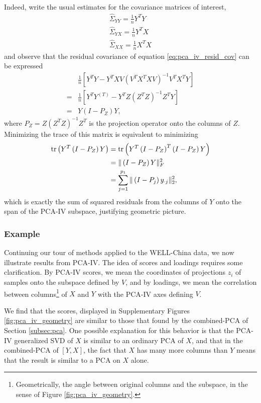 \documentclass[14pt]{extarticle}
\begin{document}
Indeed, write the usual estimates for the covariance matrices of interest,
\begin{align*}
  \hat{\Sigma}_{YY} = \frac{1}{n}Y^{T}Y \\
  \hat{\Sigma}_{YX} = \frac{1}{n}Y^{T}X \\
  \hat{\Sigma}_{XX} = \frac{1}{n}X^{T}X
\end{align*}
and observe that the residual covariance of equation \ref{eq:pca_iv_resid_cov}
can be expressed
\begin{align*}
  &\frac{1}{n}\left[Y^{T}Y -
    Y^{T}XV\left(V^{T}X^{T}XV\right)^{-1}V^{T}X^{T}Y\right] \\
  = &\frac{1}{n}\left[Y^{T}Y^{(T)} - Y^{T}Z\left(Z^{T}Z\right)^{-1}Z^{T}Y\right] \\
  = &Y\left(I - P_{Z}\right)Y,
\end{align*}
where $P_{Z} = Z\left(Z^{T}Z\right)^{-1}Z^{T}$ is the projection operator onto
the columns of $Z$. Minimizing the trace of this matrix is equivalent to
minimizing
\begin{align*}
  \mathop\mathrm{tr}\left(Y^{T}\left(I - P_{Z}\right)Y\right) &=
  \mathop\mathrm{tr}\left(Y^{T}\left(I - P_{Z}\right)^{T}\left(I -
      P_{Z}\right)Y\right) \\
  &= \|\left(I - P_{Z}\right)Y\|_{F}^{2} \\
  &= \sum_{j = 1}^{p_{1}}\|\left(I - P_{j}\right)y_{\cdot j}\|^{2}_{2},
\end{align*}
which is exactly the sum of squared residuals from the columns of $Y$ onto the
span of the PCA-IV subspace, justifying geometric picture.

\subsubsection{Example}
\label{subsec:pcaiv_example}

Continuing our tour of methods applied to the WELL-China data, we now illustrate
results from PCA-IV. The idea of scores and loadings requires some
clarification. By PCA-IV scores, we mean the coordinates of projections $z_{i}$
of samples onto the subspace defined by $V$, and by loadings, we mean the
correlation between columns\footnote{Geometrically, the angle between original
  columns and the subspace, in the sense of Figure \ref{fig:pca_iv_geometry}.}
of $X$ and $Y$ with the PCA-IV axes defining $V$.

We find that the scores, displayed in Supplementary Figures
\ref{fig:pca_iv_geometry} are similar to those that found by the combined-PCA of
Section \ref{subsec:pca}. One possible explanation for this behavior is that the
PCA-IV generalized SVD of $X$ is similar to an ordinary PCA of $X$, and that in
the combined-PCA of $\left[Y, X\right]$, the fact that $X$ has many more columns
than $Y$ means that the result is similar to a PCA on $X$ alone.
\end{document}
